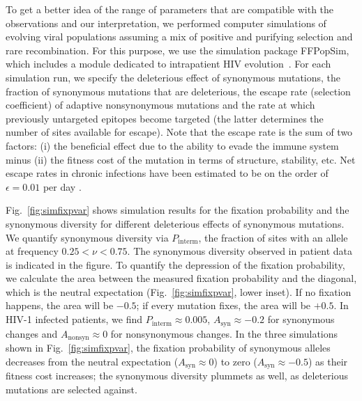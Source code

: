 \documentclass[rmp, twocolumn]{revtex4}
\newcommand{\FIG}[1]{Fig.~\ref{fig:#1}}
\begin{document}
To get a better idea of the range of parameters that are compatible with the
observations and our interpretation, we performed computer simulations of
evolving viral populations assuming a mix of positive and purifying selection
and rare recombination.  For this purpose, we use the simulation package
FFPopSim, which includes a module dedicated to intrapatient HIV
evolution~\citep{zanini_ffpopsim:_2012}. For each simulation run, we specify the
deleterious effect of synonymous mutations, the fraction of synonymous mutations
that are deleterious, the escape rate (selection coefficient) of adaptive 
nonsynonymous mutations and the rate at which previously untargeted epitopes
become targeted (the latter determines the number of sites available for escape). 
Note that the escape rate is the sum of two
factors: (i) the beneficial effect due to the ability to evade the immune system
minus (ii) the fitness cost of the mutation in terms of structure, stability,
etc. Net escape rates in chronic infections have been estimated to be on the
order of $\epsilon = 0.01$ per day \citep{neher_recombination_2010,
Asquith:2006p28003}.

\FIG{simfixpvar} shows simulation results for the fixation probability and the
synonymous diversity for different deleterious effects of synonymous mutations.
We quantify synonymous diversity via $P_\text{interm}$, the fraction of sites
with an allele at frequency $0.25 < \nu < 0.75$. The synonymous diversity
observed in patient data is indicated in the figure.  To quantify the depression
of the fixation probability, we calculate the area between the measured fixation
probability and the diagonal, which is the neutral expectation
(\FIG{simfixpvar}, lower inset). If no fixation happens, the area will be
$-0.5$; if every mutation fixes, the area will be $+0.5$. In HIV-1 infected
patients, we find $P_\text{interm} \approx 0.005$, $A_\text{syn} \approx -0.2$
for synonymous changes and $A_\text{nonsyn} \approx 0$ for nonsynonymous
changes. In the three simulations shown in \FIG{simfixpvar}, the fixation
probability of synonymous alleles decreases from the neutral expectation
($A_\text{syn} \approx 0$) to zero ($A_\text{syn} \approx -0.5$) as their
fitness cost increases; the synonymous diversity plummets as well, as
deleterious mutations are selected against.
\end{document}
